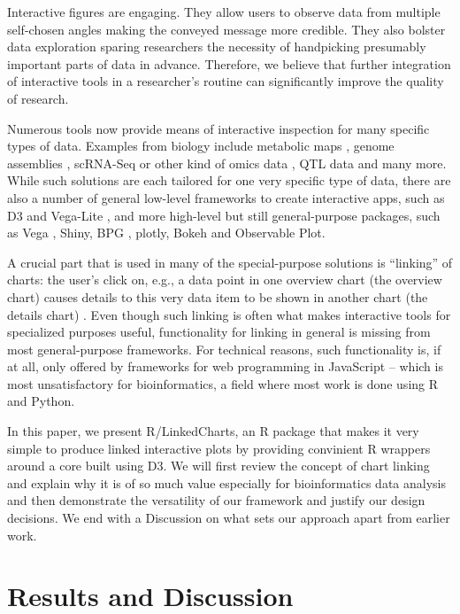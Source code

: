 \documentclass[twocolumn,10pt]{article}
\begin{document}
Interactive figures are engaging. They allow users to observe data from multiple self-chosen angles making the conveyed message more credible. They also bolster data exploration sparing researchers the necessity of handpicking presumably important parts of data in advance. Therefore, we believe that further integration of interactive tools in a researcher's routine can significantly improve the quality of research.

Numerous tools \citep{caldarola_2017} now provide means of interactive inspection for many specific types of data. Examples from biology include metabolic maps \citep{noronha_2017}, genome assemblies \citep{wick_2015}, scRNA-Seq or other kind of omics data \citep{hillje_2020, rue_2018}, QTL data \citep{broman_2015} and many more. While such solutions are each tailored for one very specific type of data, there are also a number of general low-level frameworks to create interactive apps, such as D3 \citep{bostock_2011} and Vega-Lite \citep{satyanarayan_2015}, and more high-level but still general-purpose packages, such as Vega \citep{satyanarayan_2016}, Shiny, BPG \citep{p_2019}, plotly, Bokeh and Observable Plot.

A crucial part that is used in many of the special-purpose solutions is ``linking'' of charts: the user's click on, e.g., a data point in one overview chart (the overview chart) causes details to this very data item to be shown in another chart (the details chart) \citep{buja_1991}. Even though such linking is often what makes interactive tools for specialized purposes useful, functionality for linking in general is missing from most general-purpose frameworks. For technical reasons, such functionality is, if at all, only offered by frameworks for web programming in JavaScript -- which is most unsatisfactory for bioinformatics, a field where most work is done using R and Python.

In this paper, we present R/LinkedCharts, an R package that makes it very simple to produce linked interactive plots by providing convinient R wrappers around a core built using D3. We will first review the concept of chart linking and explain why it is of so much value especially for bioinformatics data analysis and then demonstrate the versatility of our framework and justify our design decisions. We end with a Discussion on what sets our approach apart from earlier work.

\section{Results and Discussion}
\end{document}
